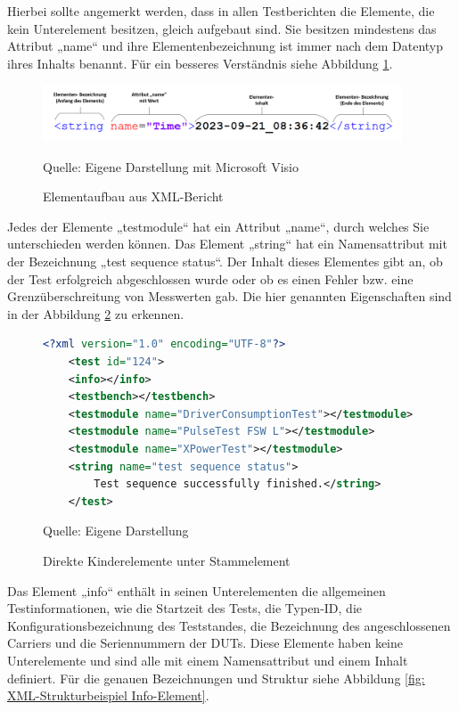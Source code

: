 Hierbei sollte angemerkt werden, dass in allen Testberichten die Elemente, die kein Unterelement besitzen, gleich aufgebaut sind.
Sie besitzen mindestens das Attribut „name“ und ihre Elementenbezeichnung ist immer nach dem Datentyp ihres Inhalts benannt.
Für ein besseres Verständnis siehe Abbildung \ref{fig: Elementaufbau aus XML-Bericht}.


\begin{figure}[H]
    \centering
    \includegraphics[width=0.95\textwidth]{Grafiken/Elementaufbau}
    \caption{Elementaufbau aus XML-Bericht}
    \label{fig: Elementaufbau aus XML-Bericht}
    {Quelle: Eigene Darstellung mit Microsoft Visio}
\end{figure}

Jedes der Elemente „testmodule“ hat ein Attribut „name“, durch welches Sie unterschieden werden können. Das Element „string“ hat
ein Namensattribut mit der Bezeichnung „test sequence status“. Der Inhalt
dieses Elementes gibt an, ob der Test erfolgreich abgeschlossen wurde oder ob
es einen Fehler bzw. eine Grenzüberschreitung von Messwerten gab.
Die hier genannten Eigenschaften sind in der Abbildung \ref{fig: Direkte Kinderelemente unter Stammelement} zu erkennen.

\begin{figure}[H]
\centering
\begin{minipage}{0.95\textwidth}
\begin{lstlisting}[language=XML]
<?xml version="1.0" encoding="UTF-8"?>
    <test id="124">
    <info></info>
    <testbench></testbench>
    <testmodule name="DriverConsumptionTest"></testmodule>
    <testmodule name="PulseTest FSW L"></testmodule>
    <testmodule name="XPowerTest"></testmodule>
    <string name="test sequence status">
        Test sequence successfully finished.</string>
    </test>
\end{lstlisting}
\end{minipage}
\caption{Direkte Kinderelemente unter Stammelement}
\label{fig: Direkte Kinderelemente unter Stammelement}
    {Quelle: Eigene Darstellung}
\end{figure}


Das Element „info“ enthält in seinen Unterelementen die allgemeinen Testinformationen, wie die Startzeit des Tests,
die Typen-ID, die Konfigurationsbezeichnung des Teststandes, die Bezeichnung des angeschlossenen Carriers und die
Seriennummern der \ac{DUTs}. Diese Elemente haben keine Unterelemente und sind alle mit einem Namensattribut und einem Inhalt definiert.
Für die genauen Bezeichnungen und Struktur siehe Abbildung \ref{fig: XML-Strukturbeispiel Info-Element}.

